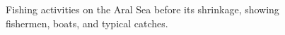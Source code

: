\begin{figure}[htbp]
\begin{minipage}[b]{0.45\textwidth}
  \end{minipage}
      \vspace{1cm}
    \newline
  \centering
  \begin{minipage}[b]{0.45\textwidth}
    \centering

  \end{minipage}
  \hfill
  \begin{minipage}[b]{0.45\textwidth}
    \centering

  \end{minipage}
      \caption{Fishing activities on the Aral Sea before its shrinkage, showing fishermen, boats, and typical catches.}
    \label{fig:fig2}
\end{figure}